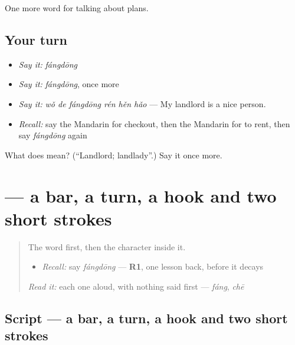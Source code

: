 \begin{grammarlens}[title={What you've built}]
One more word for talking about plans.
\end{grammarlens}

\subsection*{Your turn}
\begin{itemize}
\raggedright
  \item \emph{Say it:} \emph{fángdōng}
  \item \emph{Say it:} \emph{fángdōng}, once more
  \item \emph{Say it:} \emph{wǒ de fángdōng rén hěn hǎo} — My landlord is a nice person.
  \item \emph{Recall:} say the Mandarin for checkout, then the Mandarin for to rent, then say \emph{fángdōng} again
\end{itemize}

\begin{tcolorbox}[breakable,colback=teal!4,colframe=teal!35!black,title={Before you move on}]
What does  mean? (\textquotedblleft{}Landlord; landlady\textquotedblright{}.) Say it once more.
\end{tcolorbox}
\section[\texorpdfstring{\zh{东} (dōng)}{东 (dōng)}]{ — a bar, a turn, a hook and two short strokes}

\label{lesson:ZH-W203-dong-east}



\begin{quote}
The word first, then the character inside it.

\begin{itemize}
\raggedright
  \item \emph{Recall:} say \emph{fángdōng} — \textbf{R1}, one lesson back, before it decays
\end{itemize}

\begin{quote}
 
\end{quote}

\emph{Read it:} each one aloud, with nothing said first — \emph{fáng}, \emph{chē}
\end{quote}

\subsection*{Script — a bar, a turn, a hook and two short strokes}

